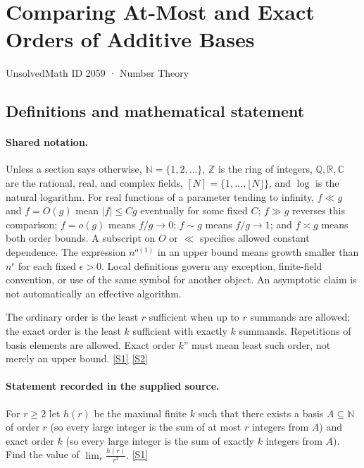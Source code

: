 \documentclass[11pt,a4paper]{article}
\newcommand{\N}{\mathbb{N}}
\newcommand{\Z}{\mathbb{Z}}
\newcommand{\Q}{\mathbb{Q}}
\newcommand{\R}{\mathbb{R}}
\newcommand{\C}{\mathbb{C}}
\newcommand{\sref}[2]{\hyperlink{source:#1:#2}{[S#2]}}
\begin{document}

\setcounter{section}{2058}

\section{Comparing At-Most and Exact Orders of Additive Bases}\label{2059}

{\small\sffamily UnsolvedMath ID 2059 · Number Theory}

\subsection{Definitions and mathematical statement}

\paragraph{Shared notation.}Unless a section says otherwise, $\N=\{1,2,\ldots\}$,
$\Z$ is the ring of integers, $\Q,\R,\C$ are the rational, real, and complex
fields, $[N]=\{1,\ldots,\lfloor N\rfloor\}$, and $\log$ is the natural
logarithm. For real functions of a parameter tending to infinity,
$f\ll g$ and $f=O(g)$ mean $|f|\leq Cg$ eventually for some fixed $C$;
$f\gg g$ reverses this comparison; $f=o(g)$ means $f/g\to0$;
$f\sim g$ means $f/g\to1$; and $f\asymp g$ means both order bounds.
A subscript on $O$ or $\ll$ specifies allowed constant dependence.
The expression $n^{o(1)}$ in an upper bound means growth smaller than
$n^\epsilon$ for each fixed $\epsilon>0$. Local definitions govern any
exception, finite-field convention, or use of the same symbol for another
object. An asymptotic claim is not automatically an effective algorithm.



The ordinary order is the least $r$ sufficient when up to $r$ summands are allowed; the exact order is the least $k$ sufficient with exactly $k$ summands. Repetitions of basis elements are allowed. Exact order $k$'' must mean least such order, not merely an upper bound. \sref{2059}{1} \sref{2059}{2}

\paragraph{Statement recorded in the supplied source.}
For $r\geq 2$ let $h(r)$ be the maximal finite $k$ such that there exists a basis $A\subseteq \mathbb{N}$ of order $r$ (so every large integer is the sum of at most $r$ integers from $A$) and exact order $k$ (so every large integer is the sum of exactly $k$ integers from $A$).
Find the value of $ \lim_r \frac{h(r)}{r^2}. $ \sref{2059}{1}
\end{document}
